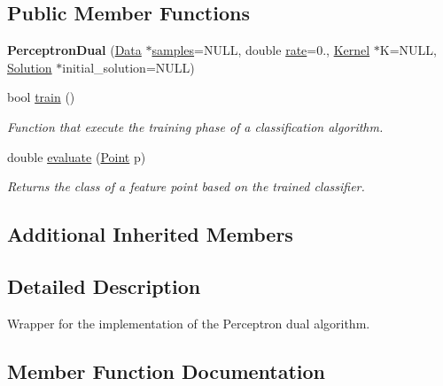 \subsection*{Public Member Functions}
\begin{DoxyCompactItemize}
\item 
\mbox{\label{class_perceptron_dual_a77604012ef519c2f4e0e32bc8387b459}} 
{\bfseries Perceptron\+Dual} (\hyperlink{class_data}{Data} $\ast$\hyperlink{class_classifier_a515c225d0da93df02ca79f9f87811d17}{samples}=N\+U\+LL, double \hyperlink{class_classifier_af9867e5919742de1303dd971a9a1c19a}{rate}=0., \hyperlink{class_kernel}{Kernel} $\ast$K=N\+U\+LL, \hyperlink{class_solution}{Solution} $\ast$initial\+\_\+solution=N\+U\+LL)
\item 
bool \hyperlink{class_perceptron_dual_a91b0bd1e86a6003b57b96199266cdc3e}{train} ()
\begin{DoxyCompactList}\small\item\em Function that execute the training phase of a classification algorithm. \end{DoxyCompactList}\item 
double \hyperlink{class_perceptron_dual_a3ed5554b85b4b1ec98f57acab3eeeaca}{evaluate} (\hyperlink{class_point}{Point} p)
\begin{DoxyCompactList}\small\item\em Returns the class of a feature point based on the trained classifier. \end{DoxyCompactList}\end{DoxyCompactItemize}
\subsection*{Additional Inherited Members}


\subsection{Detailed Description}
Wrapper for the implementation of the Perceptron dual algorithm. 

\subsection{Member Function Documentation}
\mbox{\label{class_perceptron_dual_a3ed5554b85b4b1ec98f57acab3eeeaca}} 
